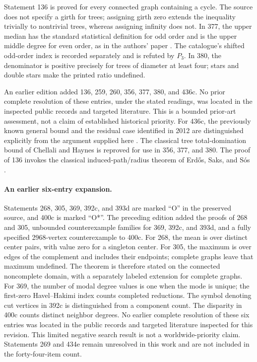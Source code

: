 \documentclass[11pt,a4paper]{article}
\theoremstyle{remark}
\begin{document}
Statement 136 is proved for every connected graph containing a cycle.
The source does not specify a girth for trees; assigning girth zero extends
the inequality trivially to nontrivial trees, whereas assigning infinity
does not. In 377, the upper median has the standard statistical definition
for odd order and is the upper middle degree for even order, as in the
authors' paper \cite[p.~14]{DLPW10_2dom}. The catalogue's shifted odd-order
index is recorded separately and is refuted by $P_3$. In 380, the denominator
is positive precisely for trees of diameter at least four; stars and double
stars make the printed ratio undefined.

An earlier edition added 136, 259, 260, 356, 377, 380, and 436c.
No prior complete resolution of these entries, under the stated readings,
was located in the inspected public records and targeted literature.
This is a bounded prior-art assessment, not a claim of established historical
priority. For 436c, the previously known general bound and the residual case
identified in 2012 are distinguished explicitly from the argument supplied
here \cite{DP12}. The classical tree total-domination bound of
Chellali and Haynes \cite{CH06} is reproved for use in 356, 377, and 380.
The proof of 136 invokes the classical induced-path/radius theorem
of Erd\H{o}s, Saks, and S\'os \cite{ESS86}.

\paragraph{An earlier six-entry expansion.}
Statements 268, 305, 369, 392c, and 393d are marked ``O'' in the preserved
source, and 400c is marked ``O*''. The preceding edition added the proofs of
268 and 305, unbounded counterexample families for 369, 392c, and 393d,
and a fully specified 2968-vertex counterexample to 400c.
For 268, the mean is over distinct center pairs, with value zero for a
singleton center. For 305, the maximum is over edges of the complement
and includes their endpoints; complete graphs leave that maximum
undefined. The theorem is therefore stated on the connected noncomplete
domain, with a separately labeled extension for complete graphs.
For 369, the number of modal degree values is one when the mode is unique;
the first-zero Havel--Hakimi index counts completed reductions. The
symbol denoting cut vertices in 392c is distinguished from a component
count. The disparity in 400c counts distinct neighbor degrees.
No earlier complete resolution of these six entries was located in the
public records and targeted literature inspected for this revision.
This limited negative search result is not a worldwide-priority claim.
Statements 269 and 434e remain unresolved in this work and are not
included in the forty-four-item count.
\end{document}
